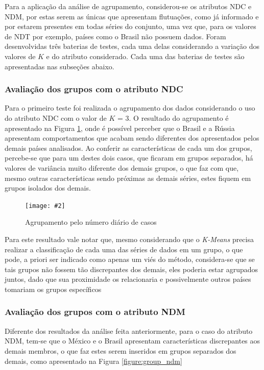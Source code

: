 \documentclass[a4paper,12pt]{article}
\newcommand{\image}[4]{
    \begin{figure}[H]%
        \begin{center}
        \caption{#3}
        \texttt{[image: \#2]}
        \label{#4}
        \end{center}
    \end{figure}
}
\begin{document}
\par Para a aplicação da análise de agrupamento, considerou-se os atributos NDC e NDM, por estas serem as únicas que apresentam flutuações, como já informado e por estarem presentes em todas séries do conjunto, uma vez que, para os valores de NDT por exemplo, países como o Brasil não possuem dados. Foram desenvolvidas três baterias de testes, cada uma delas considerando a variação dos valores de $K$ e do atributo considerado. Cada uma das baterias de testes são apresentadas nas subseções abaixo.

\subsubsection{Avaliação dos grupos com o atributo NDC}

\par Para o primeiro teste foi realizada o agrupamento dos dados considerando o uso do atributo NDC com o valor de $K $ = 3. O resultado do agrupamento é apresentado na Figura  \ref{figure:group_ndc}, onde é possível perceber que o Brasil e a Rússia apresentam comportamentos que acabam sendo diferentes dos apresentados pelos demais países analisados. Ao conferir as características de cada um dos grupos, percebe-se que para um destes dois casos, que ficaram em grupos separados, há valores de variância muito diferente dos demais grupos, o que faz com que, mesmo outras características sendo próximas as demais séries, estes fiquem em grupos isolados dos demais.

\image{0.9}{images/analise_de_agrupamento/1_grupos_k3_ndc.png}{Agrupamento pelo número diário de casos}{figure:group_ndc}

\par Para este resultado vale notar que, mesmo considerando que o \textit{K-Means} precisa realizar a classificação de cada uma das séries de dados em um grupo, o que pode, a priori ser indicado como apenas um viés do método, considera-se que se tais grupos não fossem tão discrepantes dos demais, eles poderia estar agrupados juntos, dado que sua proximidade os relacionaria e possivelmente outros países tomariam os grupos específicos

\subsubsection{Avaliação dos grupos com o atributo NDM}

\par Diferente dos resultados da análise feita anteriormente, para o caso do atributo NDM, tem-se que o México e o Brasil apresentam características discrepantes aos demais membros, o que faz estes serem inseridos em grupos separados dos demais, como apresentado na Figura \ref{figure:group_ndm}
\end{document}
